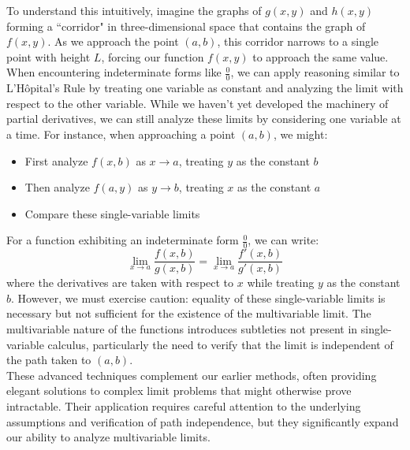 \noindent To understand this intuitively, imagine the graphs of $g(x,y)$ and $h(x,y)$ forming a ``corridor" in three-dimensional space that contains the graph of $f(x,y)$. As we approach the point $(a,b)$, this corridor narrows to a single point with height $L$, forcing our function $f(x,y)$ to approach the same value. \\

\noindent When encountering indeterminate forms like $\frac{0}{0}$, we can apply reasoning similar to L'Hôpital's Rule by treating one variable as constant and analyzing the limit with respect to the other variable. While we haven't yet developed the machinery of partial derivatives, we can still analyze these limits by considering one variable at a time. For instance, when approaching a point $(a,b)$, we might:
\begin{itemize}
    \item First analyze $f(x,b)$ as $x \to a$, treating $y$ as the constant $b$
    \item Then analyze $f(a,y)$ as $y \to b$, treating $x$ as the constant $a$
    \item Compare these single-variable limits
\end{itemize}

\noindent For a function exhibiting an indeterminate form $\frac{0}{0}$, we can write:
\[
\lim_{x \to a} \frac{f(x,b)}{g(x,b)} = \lim_{x \to a} \frac{f'(x,b)}{g'(x,b)}
\]
where the derivatives are taken with respect to $x$ while treating $y$ as the constant $b$. However, we must exercise caution: equality of these single-variable limits is necessary but not sufficient for the existence of the multivariable limit. The multivariable nature of the functions introduces subtleties not present in single-variable calculus, particularly the need to verify that the limit is independent of the path taken to $(a,b)$. \\

\noindent These advanced techniques complement our earlier methods, often providing elegant solutions to complex limit problems that might otherwise prove intractable. Their application requires careful attention to the underlying assumptions and verification of path independence, but they significantly expand our ability to analyze multivariable limits.


